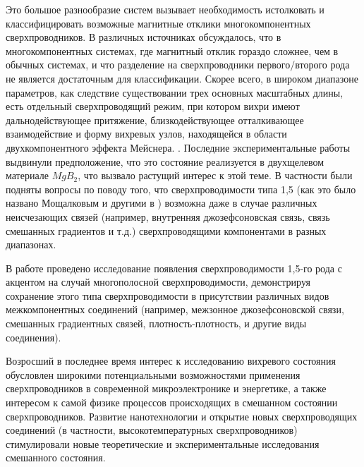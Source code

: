 Это большое разнообразие систем вызывает необходимость истолковать и 
классифицировать возможные магнитные отклики многокомпонентных 
сверхпроводников. В различных источниках обсуждалось, что в многокомпонентных 
системах, где магнитный отклик гораздо сложнее, чем в обычных системах, и что 
разделение на сверхпроводники первого/второго рода не является достаточным для 
классификации. Скорее всего, в широком диапазоне параметров, как следствие 
существовании трех основных масштабных длины, есть отдельный сверхпроводящий 
режим, при котором вихри имеют дальнодействующее притяжение, близкодействующее 
отталкивающее взаимодействие и форму вихревых узлов, находящейся в области
двухкомпонентного эффекта Мейснера. \cite{bib:1,bib:2}. Последние 
экспериментальные работы \cite{bib:16,bib:17} выдвинули предположение, что 
это состояние реализуется в двухщелевом материале \( MgB_2 \), что вызвало 
растущий интерес к этой теме. В частности были подняты вопросы по поводу того, 
что сверхпроводимости типа 1,5 (как это было названо Мощалковым и другими в 
\cite{bib:16}) возможна даже в случае различных неисчезающих связей (например, 
внутренняя джозефсоновская связь, связь смешанных градиентов и т.д.) 
сверхпроводящими компонентами в разных диапазонах. \cite{bib:main}

В работе проведено исследование появления сверхпроводимости 1,5-го рода с 
акцентом на случай многополосной сверхпроводимости, демонстрируя сохранение 
этого типа сверхпроводимости в присутствии различных видов межкомпонентных 
соединений (например, межзонное джозефсоновской связи, смешанных градиентных 
связей, плотность-плотность, и другие виды соединения).

Возросший в последнее время интерес к исследованию вихревого состояния 
обусловлен широкими потенциальными возможностями применения сверхпроводников в 
современной микроэлектронике и энергетике, а также интересом к самой физике 
процессов происходящих в смешанном состоянии сверхпроводников. Развитие 
нанотехнологии и открытие новых сверхпроводящих соединений (в частности, 
высокотемпературных сверхпроводников) стимулировали новые теоретические и
экспериментальные исследования смешанного состояния. 

